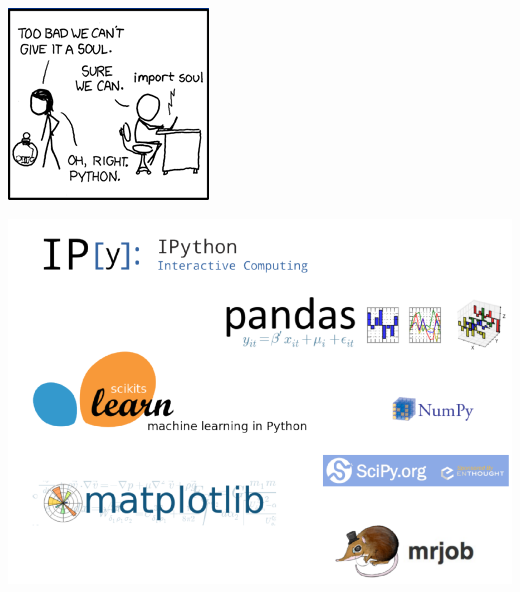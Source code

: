 \documentclass{beamer}
\begin{document}
\begin{frame}{}
    \begin{center}
        \includegraphics[scale=0.7]{python4.png}
    \end{center}
\end{frame}
\begin{frame}{}
    \begin{center}
        \includegraphics[scale=0.3]{scientificPython.png}
    \end{center}
\end{frame}
\end{document}
